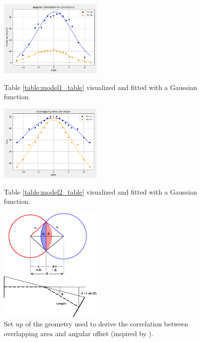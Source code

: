 \documentclass[12pt, letterpaper, twocolumn]{article}
\begin{document}
\begin{figure}[H]
    \centering
    \includegraphics[width=0.45\textwidth]{Figures/coincidence_gauss_fit.png}
    \caption{Table \ref{table:model1_table} visualized and fitted with a Gaussian
    function.}
    \label{figure:model1_graph}
    \includegraphics[width=0.45\textwidth]{Figures/overlapping_area_gauss_fit.png}
    \caption{Table \ref{table:model2_table} visualized and fitted with a Gaussian
    function.}
    \label{figure:model2_graph}
    \includegraphics[width=0.45\textwidth]{Figures/geometry.jpg}
    \caption{Set up of the geometry used to derive the correlation between
    overlapping area and angular offset (inspired by \cite{Geometry}).}
    \label{figure:geometry}
\end{figure}
\newpage

\printbibliography
\end{document}
